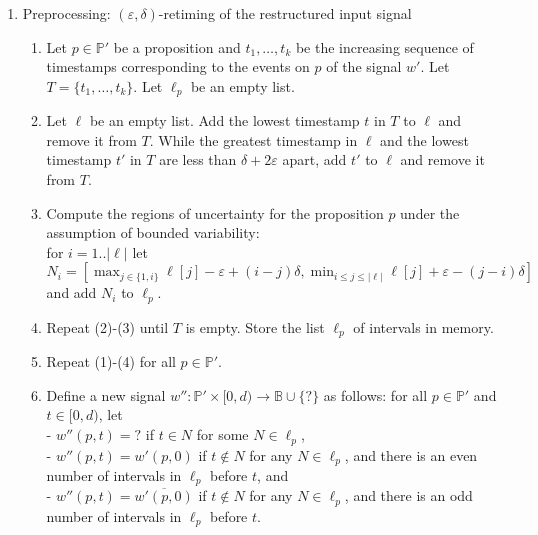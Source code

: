 \documentclass[envcountsame, runningheads]{llncs}
\newcommand{\rednote}[2][]{{\todo[color=magenta!80,size=\footnotesize,#1]{\normalcolor\normalfont#2}}}
\newcommand{\B}{\mathbb{B}}
\newcommand{\?}{\text{?}}
\begin{document}
\begin{enumerate}
		\item Preprocessing: $(\varepsilon,\delta)$-retiming of the restructured input signal
		\begin{enumerate}[label=\arabic*.]
			\item Let $p \in \mathbb{P}'$ be a proposition and $t_1, \ldots, t_k$ be the increasing sequence of timestamps corresponding to the events on $p$ of the signal $w'$. Let $T = \{t_1, \ldots, t_k\}$. Let $\ell_p$ be an empty list.
			\item Let $\ell$ be an empty list. Add the lowest timestamp $t$ in $T$ to $\ell$ and remove it from $T$. While the greatest timestamp in $\ell$ and the lowest timestamp $t'$ in $T$ are less than $\delta + 2\varepsilon$ apart, add $t'$ to $\ell$ and remove it from $T$.
			\item Compute the regions of uncertainty for the proposition $p$ under the assumption of bounded variability:\\ for $i = 1 .. |\ell|$ let $N_i = \left[\max_{j \in \{1, i\}} \ell[j] - \varepsilon + (i-j)\delta, \min_{i \leq j \leq |\ell|} \ell[j] + \varepsilon - (j-i)\delta\right]$ %
			and add $N_i$ to $\ell_p$.
			\item Repeat (2)-(3) until $T$ is empty. Store the list $\ell_p$ of intervals in memory.
			\item Repeat (1)-(4) for all $p \in \mathbb{P}'$.
			\item Define a new signal $w'' : \mathbb{P}' \times [0,d) \to \B \cup \{\?\}$ as follows: for all $p \in \mathbb{P}'$ and $t \in [0,d)$, let \\
			- $w''(p,t) = \?$ if $t \in N$ for some $N \in \ell_p$, \\
			- $w''(p,t) = w'(p,0)$ if $t \notin N$ for any $N \in \ell_p$, and there is an even number of intervals in $\ell_p$ before $t$, and \\
			- $w''(p,t) = \overline{w'(p,0)}$ if $t \notin N$ for any $N \in \ell_p$, and there is an odd number of intervals in $\ell_p$ before $t$.
		\end{enumerate}
		

\end{enumerate}
\end{document}
